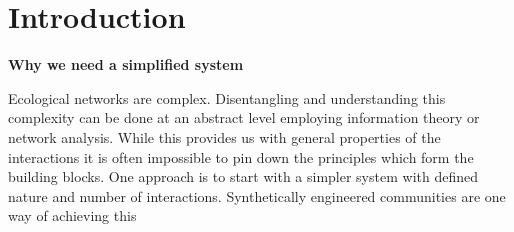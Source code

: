 \section{Introduction}


\textbf{Why we need a simplified system}

Ecological networks are complex.
Disentangling and understanding this complexity can be done at an abstract level employing information theory or network analysis.
While this provides us with general properties of the interactions it is often impossible to pin down the principles which form the building blocks.
One approach is to start with a simpler system with defined nature and number of interactions.
Synthetically engineered communities are one way of achieving this \citep{momeni:elife:2013}